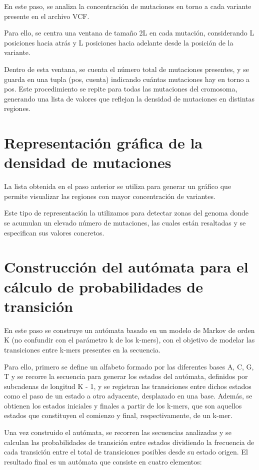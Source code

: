 \documentclass[11pt,spanish,listoffigures,listoftables]{tfgetsinf}
\begin{document}
En este paso, se analiza la concentración de mutaciones en torno a cada variante presente en el archivo \ac{VCF}. 

Para ello, se centra una ventana de tamaño 2L en cada mutación, considerando L posiciones hacia atrás y L posiciones hacia adelante desde la posición de la variante. 

Dentro de esta ventana, se cuenta el número total de mutaciones presentes, y se guarda en una tupla (pos, cuenta) indicando cuántas mutaciones hay en torno a pos. Este procedimiento se repite para todas las mutaciones del cromosoma, generando una lista de valores que reflejan la densidad de mutaciones en distintas regiones. 

\section{Representación gráfica de la densidad de mutaciones}

La lista obtenida en el paso anterior se utiliza para generar un gráfico que permite visualizar las regiones con mayor concentración de variantes.

Este tipo de representación la utilizamos para detectar zonas del genoma donde se acumulan un elevado número de mutaciones, las cuales están resaltadas y se especifican sus valores concretos.

\section{Construcción del autómata para el cálculo de probabilidades de transición}

En este paso se construye un autómata basado en un modelo de Markov de orden K (no confundir con el parámetro k de los k-mers), con el objetivo de modelar las transiciones entre k-mers presentes en la secuencia. 

Para ello, primero se define un alfabeto formado por las diferentes bases {A, C, G, T} y se recorre la secuencia para generar los estados del autómata, definidos por subcadenas de longitud K - 1, y se registran las transiciones entre dichos estados como el paso de un estado a otro adyacente, desplazado en una base. Además, se obtienen los estados iniciales y finales a partir de los k-mers, que son aquellos estados que constituyen el comienzo y final, respectivamente, de un k-mer.  

Una vez construido el autómata, se recorren las secuencias analizadas y se calculan las probabilidades de transición entre estados dividiendo la frecuencia de cada transición entre el total de transiciones posibles desde su estado origen. El resultado final es un autómata que consiste en cuatro elementos:  
\end{document}
